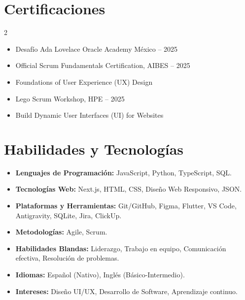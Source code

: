 \documentclass[10pt,letterpaper]{article}
\begin{document}
\section{Certificaciones}
\begin{multicols}{2}
\begin{itemize}[leftmargin=10pt, noitemsep, topsep=1pt]
  \item Desafío Ada Lovelace Oracle Academy México -- 2025
  \item Official Scrum Fundamentals Certification, AIBES -- 2025
  \item Foundations of User Experience (UX) Design
  \item Lego Scrum Workshop, HPE -- 2025
  \item Build Dynamic User Interfaces (UI) for Websites
\end{itemize}
\end{multicols}

\vspace{-6pt} %

\section{Habilidades y Tecnologías}
\begin{itemize}[leftmargin=0pt, label={}, noitemsep, topsep=2pt, itemsep=2.5pt]
  \item \textbf{Lenguajes de Programación:} JavaScript, Python, TypeScript, SQL.
  \item \textbf{Tecnologías Web:} Next.js, HTML, CSS, Diseño Web Responsivo, JSON.
  \item \textbf{Plataformas y Herramientas:} Git/GitHub, Figma, Flutter, VS Code, Antigravity, SQLite, Jira, ClickUp.
  \item \textbf{Metodologías:} Agile, Scrum.
  \item \textbf{Habilidades Blandas:} Liderazgo, Trabajo en equipo, Comunicación efectiva, Resolución de problemas.
  \item \textbf{Idiomas:} Español (Nativo), Inglés (Básico-Intermedio).
  \item \textbf{Intereses:} Diseño UI/UX, Desarrollo de Software, Aprendizaje continuo.
\end{itemize}
\end{document}
